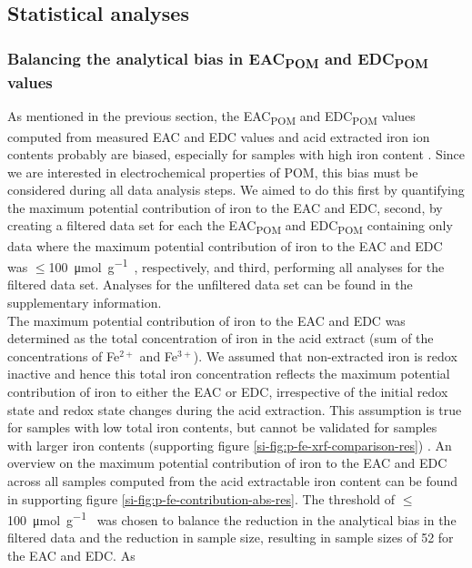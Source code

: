 \documentclass[draft,linenumbers]{agujournal2018}
\begin{document}
\subsection{Statistical analyses}

\subsubsection{\texorpdfstring{Balancing the analytical bias in
EAC\textsubscript{POM} and EDC\textsubscript{POM}
values}{Balancing the analytical bias in EAC and EDC values}}

As mentioned in the previous section, the EAC\textsubscript{POM} and
EDC\textsubscript{POM} values computed from measured EAC and EDC values
and acid extracted iron ion contents probably are biased, especially for
samples with high iron content \citep{Lau.2015, Lau.2016}. Since we are
interested in electrochemical properties of POM, this bias must be
considered during all data analysis steps. We aimed to do this first by
quantifying the maximum potential contribution of iron to the EAC and
EDC, second, by creating a filtered data set for each the
EAC\textsubscript{POM} and EDC\textsubscript{POM} containing only data
where the maximum potential contribution of iron to the EAC and EDC was
\(\le\)\SI{100}{\micro\mol\per\gram\carbon}, respectively, and third,
performing all analyses for the filtered data set. Analyses for the
unfiltered data set can be found in the supplementary information.\\
The maximum potential contribution of iron to the EAC and EDC was
determined as the total concentration of iron in the acid extract (sum
of the concentrations of Fe\(^{2+}\) and Fe\(^{3+}\)). We assumed that
non-extracted iron is redox inactive and hence this total iron
concentration reflects the maximum potential contribution of iron to
either the EAC or EDC, irrespective of the initial redox state and redox
state changes during the acid extraction. This assumption is true for
samples with low total iron contents, but cannot be validated for
samples with larger iron contents (supporting figure
\ref{si-fig:p-fe-xrf-comparison-res}) \citep{Lau.2016}. An overview on
the maximum potential contribution of iron to the EAC and EDC across all
samples computed from the acid extractable iron content can be found in
supporting figure \ref{si-fig:p-fe-contribution-abs-res}. The threshold
of \(\le\)\SI{100}{\micro\mol\per\gram\carbon} was chosen to balance the
reduction in the analytical bias in the filtered data and the reduction
in sample size, resulting in sample sizes of 52 for the EAC and EDC. As
\end{document}
